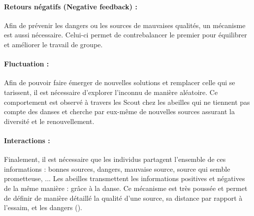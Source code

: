 \paragraph{Retours négatifs (Negative feedback) :} %
\label{par:negative_feedback}
Afin de prévenir les dangers ou les sources de mauvaises qualités, un mécanisme est
aussi nécessaire. Celui-ci permet de contrebalancer le premier pour équilibrer
et améliorer le travail de groupe.

\paragraph{Fluctuation :} %
\label{par:fluctuation}
Afin de pouvoir faire émerger de nouvelles solutions et remplacer celle qui se
tarissent, il est nécessaire d’explorer l’inconnu de manière aléatoire. Ce comportement est observé
à travers les Scout chez les abeilles qui ne tiennent pas compte des danses et
cherche par eux-même de nouvelles sources assurant la diversité et le renouvellement.

\paragraph{Interactions :} %
\label{par:intractions}
Finalement, il est nécessaire que les individus partagent l’ensemble de ces
informations : bonnes sources, dangers, mauvaise source, source qui semble prometteuse, ...
Les abeilles transmettent les informations positives et négatives de la même manière : grâce à la danse.
Ce mécanisme est très poussée et permet de définir de manière détaillé la qualité
d’une source, sa distance par rapport à l’essaim, et les dangers ().



